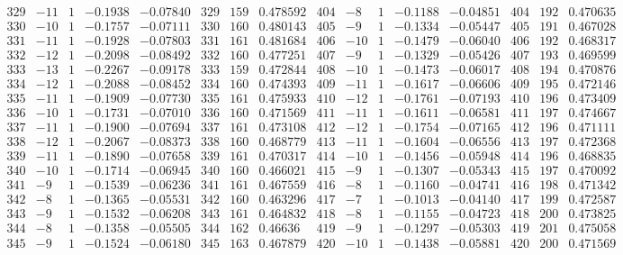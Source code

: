 \documentclass[11pt,reqno,a4letter]{article}
\numberwithin{figure}{section}
\numberwithin{table}{section}
\theoremstyle{plain}
\numberwithin{theorem}{section}
\theoremstyle{definition}
\begin{document}
\begin{table}[ht]
\begin{equation*}
{\begin{array}{ccccc|ccc|ccccc|ccc}
 329 & -11 & 1 & -0.1938 & -0.07840 & 329 & 159 & 0.478592 & 404 & -8 & 1 & -0.1188 & -0.04851 & 404 & 192 & 0.470635 \\
 330 & -10 & 1 & -0.1757 & -0.07111 & 330 & 160 & 0.480143 & 405 & -9 & 1 & -0.1334 & -0.05447 & 405 & 191 & 0.467028 \\
 331 & -11 & 1 & -0.1928 & -0.07803 & 331 & 161 & 0.481684 & 406 & -10 & 1 & -0.1479 & -0.06040 & 406 & 192 & 0.468317 \\
 332 & -12 & 1 & -0.2098 & -0.08492 & 332 & 160 & 0.477251 & 407 & -9 & 1 & -0.1329 & -0.05426 & 407 & 193 & 0.469599 \\
 333 & -13 & 1 & -0.2267 & -0.09178 & 333 & 159 & 0.472844 & 408 & -10 & 1 & -0.1473 & -0.06017 & 408 & 194 & 0.470876 \\
 334 & -12 & 1 & -0.2088 & -0.08452 & 334 & 160 & 0.474393 & 409 & -11 & 1 & -0.1617 & -0.06606 & 409 & 195 & 0.472146 \\
 335 & -11 & 1 & -0.1909 & -0.07730 & 335 & 161 & 0.475933 & 410 & -12 & 1 & -0.1761 & -0.07193 & 410 & 196 & 0.473409 \\
 336 & -10 & 1 & -0.1731 & -0.07010 & 336 & 160 & 0.471569 & 411 & -11 & 1 & -0.1611 & -0.06581 & 411 & 197 & 0.474667 \\
 337 & -11 & 1 & -0.1900 & -0.07694 & 337 & 161 & 0.473108 & 412 & -12 & 1 & -0.1754 & -0.07165 & 412 & 196 & 0.471111 \\
 338 & -12 & 1 & -0.2067 & -0.08373 & 338 & 160 & 0.468779 & 413 & -11 & 1 & -0.1604 & -0.06556 & 413 & 197 & 0.472368 \\
 339 & -11 & 1 & -0.1890 & -0.07658 & 339 & 161 & 0.470317 & 414 & -10 & 1 & -0.1456 & -0.05948 & 414 & 196 & 0.468835 \\
 340 & -10 & 1 & -0.1714 & -0.06945 & 340 & 160 & 0.466021 & 415 & -9 & 1 & -0.1307 & -0.05343 & 415 & 197 & 0.470092 \\
 341 & -9 & 1 & -0.1539 & -0.06236 & 341 & 161 & 0.467559 & 416 & -8 & 1 & -0.1160 & -0.04741 & 416 & 198 & 0.471342 \\
 342 & -8 & 1 & -0.1365 & -0.05531 & 342 & 160 & 0.463296 & 417 & -7 & 1 & -0.1013 & -0.04140 & 417 & 199 & 0.472587 \\
 343 & -9 & 1 & -0.1532 & -0.06208 & 343 & 161 & 0.464832 & 418 & -8 & 1 & -0.1155 & -0.04723 & 418 & 200 & 0.473825 \\
 344 & -8 & 1 & -0.1358 & -0.05505 & 344 & 162 & 0.46636 & 419 & -9 & 1 & -0.1297 & -0.05303 & 419 & 201 & 0.475058 \\
 345 & -9 & 1 & -0.1524 & -0.06180 & 345 & 163 & 0.467879 & 420 & -10 & 1 & -0.1438 & -0.05881 & 420 & 200 & 0.471569 \\

\end{array}}
\end{equation*}
\end{table}
\end{document}
